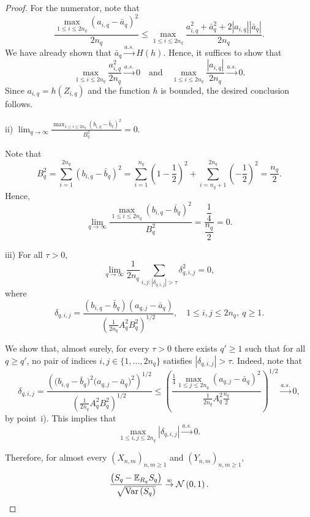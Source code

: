 \begin{proof}
    For the numerator, note that
    \[
    \frac{\max_{1 \leq i \leq 2n_q}\left( a_{i,q} - \bar{a}_q \right)^2}{2n_q}
    \leq
    \max_{1 \leq i \leq 2n_q}
    \frac{a_{i,q}^2 + \bar{a}_q^2 + 2|a_{i,q}||\bar{a}_q|}{2n_q}.
    \]
    We have already shown that $\bar{a}_q \overset{a.s.}{\to} H(h)$. Hence, it suffices to show that
    \[
    \max_{1 \leq i \leq 2n_q} \frac{a_{i,q}^2}{2n_q}
    \overset{a.s.}{\to} 0
    \quad \text{and} \quad
    \max_{1 \leq i \leq 2n_q} \frac{|a_{i,q}|}{2n_q}
    \overset{a.s.}{\to} 0.
    \]
    Since $a_{i,q} = h\left(Z_{i,q}\right)$ and the function $h$ is bounded, the desired conclusion follows.

  ii) $\displaystyle \lim_{q \to \infty}
    \frac{\max_{1 \leq i \leq 2n_q} \left(b_{i,q} - \bar{b}_q \right)^2}{B_q^2} = 0.$

    Note that
    \[
    B_q^2
    = \sum_{i = 1}^{2n_q} (b_{i,q} - \bar{b}_q)^2
    = \sum_{i = 1}^{n_q}\left( 1 - \frac{1}{2}\right)^2
    + \sum_{i = n_q + 1}^{2n_q}\left( - \frac{1}{2}\right)^2
    = \frac{n_q}{2}.
    \]
    Hence,
    \[
    \lim_{q \to \infty}
    \frac{\max_{1 \leq i \leq 2n_q} \left(b_{i,q} - \bar{b}_q \right)^2}{B_q^2}
    = \dfrac{\dfrac{1}{4}}{\dfrac{n_q}{2}}
    = 0.
    \]

iii) For all $\tau > 0$,
    \[
    \lim_{q \to \infty}
    \frac{1}{2n_q}\sum_{i,j : |\delta_{q,i,j}| > \tau}\delta_{q,i,j}^2 = 0,
    \]
    where
    \[
    \delta_{q,i,j}
    = \frac{\left( b_{i,q} - \bar{b}_q\right)\left( a_{q,j} - \bar{a}_q\right)}
    {\left( \frac{1}{2n_q}A_q^2 B_q^2\right)^{1/2}},
    \quad 1 \leq i,j \leq 2n_q,\ q \geq 1.
    \]

    We show that, almost surely, for every $\tau > 0$ there exists $q' \geq 1$ such that for all $q \geq q'$, no pair of indices $i,j \in \{1,\dots,2n_q\}$ satisfies $|\delta_{q,i,j}| > \tau$. Indeed, note that
    \[
    \delta_{q,i,j}
    = \frac{\left(\big( b_{i,q} - \bar{b}_q\big)^2\big( a_{q,j} - \bar{a}_q\big)^2\right)^{1/2}}
    {\left( \frac{1}{2n_q}A_q^2 B_q^2\right)^{1/2}}
    \leq
    \left(
    \frac{\frac{1}{4}\max_{1\leq j \leq 2n_q}\left( a_{q,j} - \bar{a}_q\right)^2}
    {\frac{1}{2n_q}A_q^2 \frac{n_q}{2}}
    \right)^{1/2}
    \overset{a.s.}{\to} 0,
    \]
    by point~i). This implies that
    \[
    \max_{1 \leq i,j \leq 2n_q} |\delta_{q,i,j}|
    \overset{a.s.}{\to} 0.
    \]

Therefore, for almost every $(X_{n,m})_{n,m\geq 1}$ and
$(Y_{n,m})_{n,m\geq 1}$,
\[
\frac{\left( S_q - \mathbb{E}_{R_q}S_q\right)}{\sqrt{\mathrm{Var}\left(S_q\right)}}
\overset{w}{\to} \mathcal{N}\left(0,1\right).
\]


\end{proof}
